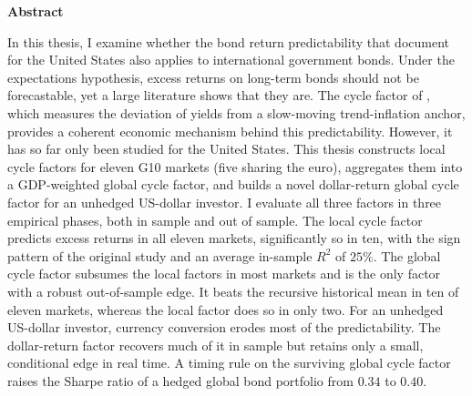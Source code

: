 \begin{center}\textbf{\large Abstract}\end{center}

\noindent
In this thesis, I examine whether the bond return predictability that
\citet{cieslak2015} document for the United States also applies to
international government bonds. Under the expectations hypothesis, excess
returns on long-term bonds should not be forecastable, yet a large
literature shows that they are. The cycle factor of \citet{cieslak2015},
which measures the deviation of yields from a slow-moving trend-inflation
anchor, provides a coherent economic mechanism behind this predictability.
However, it has so far only been studied for the United States. This thesis
constructs local cycle factors for eleven G10 markets (five sharing the euro),
aggregates them into a GDP-weighted global cycle factor, and builds a novel dollar-return
global cycle factor for an unhedged US-dollar investor. I evaluate all
three factors in three empirical phases, both in sample and out of sample. The local cycle factor predicts excess returns in all eleven markets, significantly
so in ten, with the sign pattern of the
original study and an average in-sample $R^{2}$ of $25\%$. The global cycle factor subsumes the local factors in most markets
and is the only factor with a robust out-of-sample edge. It
beats the recursive historical mean in ten of eleven markets, whereas the
local factor does so in only two. For an unhedged US-dollar investor,
currency conversion erodes most of the predictability. The dollar-return
factor recovers much of it in sample but retains only a small, conditional
edge in real time. A timing rule on the surviving global cycle factor raises
the Sharpe ratio of a hedged global bond portfolio from $0.34$ to $0.40$.
\vspace{1cm}
